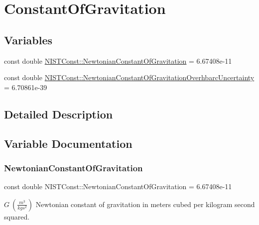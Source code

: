 \hypertarget{group___constant_of_gravitation}{}\section{Constant\+Of\+Gravitation}
\label{group___constant_of_gravitation}
\subsection*{Variables}
\begin{DoxyCompactItemize}
\item 
const double \hyperlink{group___constant_of_gravitation_gaba6371307f4cebde50b3c61a07c724c5}{N\+I\+S\+T\+Const\+::\+Newtonian\+Constant\+Of\+Gravitation} = 6.\+67408e-\/11
\item 
const double \hyperlink{group___constant_of_gravitation_gaf10cbbd8ad1ece4ec01e35fe3d86854f}{N\+I\+S\+T\+Const\+::\+Newtonian\+Constant\+Of\+Gravitation\+Overhbarc\+Uncertainty} = 6.\+70861e-\/39
\end{DoxyCompactItemize}


\subsection{Detailed Description}


\subsection{Variable Documentation}
\mbox{\label{group___constant_of_gravitation_gaba6371307f4cebde50b3c61a07c724c5}} 
\subsubsection{\texorpdfstring{Newtonian\+Constant\+Of\+Gravitation}{NewtonianConstantOfGravitation}}
{\footnotesize\ttfamily const double N\+I\+S\+T\+Const\+::\+Newtonian\+Constant\+Of\+Gravitation = 6.\+67408e-\/11}

$G \ (\frac{m^3}{kg s^2})$ Newtonian constant of gravitation in meters cubed per kilogram second squared. \mbox{\label{group___constant_of_gravitation_gaf10cbbd8ad1ece4ec01e35fe3d86854f}} 
